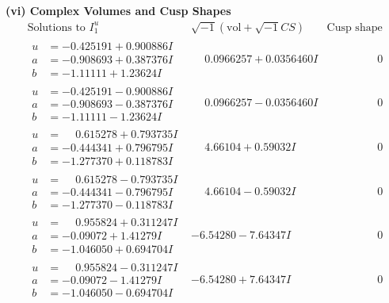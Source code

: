 \documentclass[1p]{elsarticle_modified}
\theoremstyle{definition}
\newcommand{\I}{\sqrt{-1}}
\begin{document}
\newpage\flushleft \textbf{(vi) Complex Volumes and Cusp Shapes}
$$\begin{array}{c|c|c}  
\text{Solutions to }I^u_{1}& \I (\text{vol} + \sqrt{-1}CS) & \text{Cusp shape}\\
 \hline 
\begin{aligned}
u &= -0.425191 + 0.900886 I \\
a &= -0.908693 + 0.387376 I \\
b &= -1.11111 + 1.23624 I\end{aligned}
 & \phantom{-}0.0966257 + 0.0356460 I & \phantom{-0.000000 } 0 \\ \hline\begin{aligned}
u &= -0.425191 - 0.900886 I \\
a &= -0.908693 - 0.387376 I \\
b &= -1.11111 - 1.23624 I\end{aligned}
 & \phantom{-}0.0966257 - 0.0356460 I & \phantom{-0.000000 } 0 \\ \hline\begin{aligned}
u &= \phantom{-}0.615278 + 0.793735 I \\
a &= -0.444341 + 0.796795 I \\
b &= -1.277370 + 0.118783 I\end{aligned}
 & \phantom{-}4.66104 + 0.59032 I & \phantom{-0.000000 } 0 \\ \hline\begin{aligned}
u &= \phantom{-}0.615278 - 0.793735 I \\
a &= -0.444341 - 0.796795 I \\
b &= -1.277370 - 0.118783 I\end{aligned}
 & \phantom{-}4.66104 - 0.59032 I & \phantom{-0.000000 } 0 \\ \hline\begin{aligned}
u &= \phantom{-}0.955824 + 0.311247 I \\
a &= -0.09072 + 1.41279 I \\
b &= -1.046050 + 0.694704 I\end{aligned}
 & -6.54280 - 7.64347 I & \phantom{-0.000000 } 0 \\ \hline\begin{aligned}
u &= \phantom{-}0.955824 - 0.311247 I \\
a &= -0.09072 - 1.41279 I \\
b &= -1.046050 - 0.694704 I\end{aligned}
 & -6.54280 + 7.64347 I & \phantom{-0.000000 } 0 \\ \hline\begin{aligned}

\end{aligned}
\end{array}$$
\end{document}
